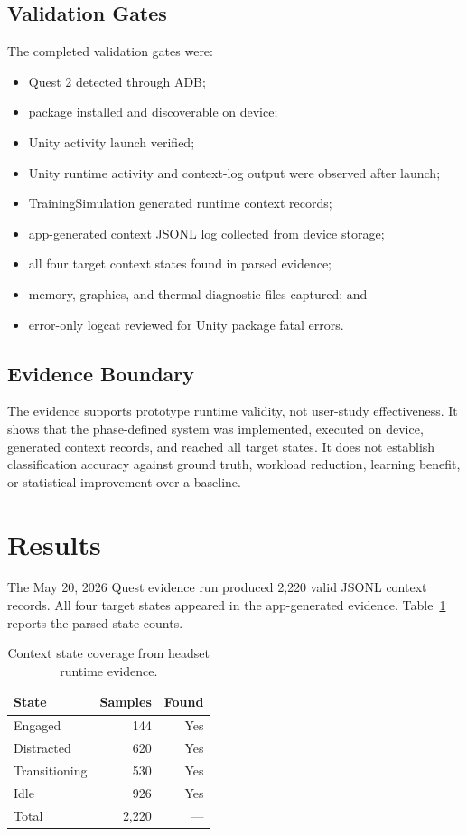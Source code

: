 \documentclass[conference]{IEEEtran}
\begin{document}
\subsection{Validation Gates}
The completed validation gates were:
\begin{itemize}
\item Quest 2 detected through ADB;
\item package installed and discoverable on device;
\item Unity activity launch verified;
\item Unity runtime activity and context-log output were observed after launch;
\item TrainingSimulation generated runtime context records;
\item app-generated context JSONL log collected from device storage;
\item all four target context states found in parsed evidence;
\item memory, graphics, and thermal diagnostic files captured; and
\item error-only logcat reviewed for Unity package fatal errors.
\end{itemize}

\subsection{Evidence Boundary}
The evidence supports prototype runtime validity, not user-study effectiveness. It shows that the phase-defined system was implemented, executed on device, generated context records, and reached all target states. It does not establish classification accuracy against ground truth, workload reduction, learning benefit, or statistical improvement over a baseline.

\section{Results}
The May 20, 2026 Quest evidence run produced 2,220 valid JSONL context records. All four target states appeared in the app-generated evidence. Table~\ref{tab:statecoverage} reports the parsed state counts.

\begin{table}[t]
\centering
\caption{Context state coverage from headset runtime evidence.}
\label{tab:statecoverage}
\begin{tabular}{lrr}
\toprule
State & Samples & Found \\
\midrule
Engaged & 144 & Yes \\
Distracted & 620 & Yes \\
Transitioning & 530 & Yes \\
Idle & 926 & Yes \\
\midrule
Total & 2,220 & --- \\
\bottomrule
\end{tabular}
\end{table}
\end{document}
